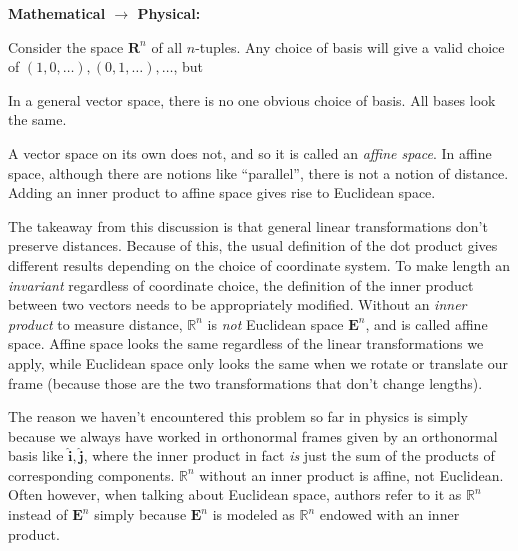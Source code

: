 \documentclass[../master.tex]{subfiles}
\begin{document}
	\begin{center}
		\textbf{Mathematical $\to$ Physical:}
	\end{center}
	
	Consider the space $\mathbf R^n$ of all $n$-tuples. Any choice of basis will give a valid choice of $(1,0, \dots ), (0, 1, \dots), \dots$, but
	
	In a general vector space, there is no one obvious choice of basis. All bases look the same. 
	
	A vector space on its own does not, and so it is called an \emph{affine space}. In affine space, although there are notions like ``parallel'', there is not a notion of distance. Adding an inner product to affine space gives rise to Euclidean space.
	
	
	The takeaway from this discussion is that general linear transformations don't preserve distances. Because of this, the usual definition of the dot product gives different results depending on the choice of coordinate system. To make length an \emph{invariant} regardless of coordinate choice, the definition of the inner product between two vectors needs to be appropriately modified. Without an \emph{inner product} to measure distance, $\mathbb{R}^n$ is \emph{not} Euclidean space $\mathbf{E}^n$, and is called affine space. Affine space looks the same regardless of the linear transformations we apply, while Euclidean space only looks the same when we rotate or translate our frame (because those are the two transformations that don't change lengths). 
	
	The reason we haven't encountered this problem so far in physics is simply because we always have worked in orthonormal frames given by an orthonormal basis like $\hat{\mathbf{i}}, \hat{\mathbf{j}}$, where the inner product in fact \emph{is} just the sum of the products of corresponding components. $\mathbb{R}^n$ without an inner product is affine, not Euclidean. Often however, when talking about Euclidean space, authors refer to it as $\mathbb{R}^n$ instead of $\mathbf{E}^n$ simply because $\mathbf{E}^n$ is modeled as $\mathbb{R}^n$ endowed with an inner product.
	
\end{document}
